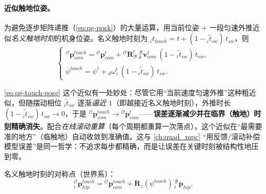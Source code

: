 \paragraph{近似触地位姿。}
为避免逐步矩阵递推（\cref{eq:qg-posk}）的大量运算，用当前位姿 + 一段匀速外推近似\emph{名义触地时刻}的机身位姿\cite{yu2021quadruped}。名义触地时刻为 ${}_it_{touch}=t+(1-{}_i\tilde t_{sw})\,t_{sw}$，则
\begin{equation}
  \begin{cases}
  {}^{\mathcal{O}}\boldsymbol{p}_{com}^{touch}={}^{\mathcal{O}}\boldsymbol{p}_{com}^{t}+{}^{\mathcal{O}}\mathbf{R}_{\mathcal{B}}^{t}\,{}_d^{\mathcal{B}}\boldsymbol{v}_{com}^{t}\,(1-{}_i\tilde t_{sw})\,t_{sw},\\
  \psi^{touch}=\psi^{t}+{}_d\omega_z^{t}\,(1-{}_i\tilde t_{sw})\,t_{sw}.
  \end{cases}
  \label{eq:qg-touch-pose}
\end{equation}

\begin{insight}\label{ins:qg-touch-vanish}
\cref{eq:qg-touch-pose} 这个近似有一处妙处：尽管它用“当前速度匀速外推”这种粗近似，但随摆动相位 ${}_i\tilde t_{sw}$ 逐渐\emph{逼近 $1$}（即越接近名义触地时刻），外推时长 $(1-{}_i\tilde t_{sw})\,t_{sw}\to0$，于是 ${}^{\mathcal{O}}\boldsymbol{p}_{com}^{touch}\to{}^{\mathcal{O}}\boldsymbol{p}_{com}^{t}$——\textbf{误差逐渐减少并在临界（触地）时刻精确消失}\cite{yu2021quadruped}。配合\emph{在线滚动重算}（每个周期都重算一次落点），这个近似在“最需要准的地方”（临触地）自动收敛到准确值。这与 \cref{ch:quad_mpc} “用反馈/滚动补偿模型误差”是同一哲学：不追求每步都精确，而是让误差在关键时刻被结构性地压到零。
\end{insight}

名义触地时刻的对称点（世界系）\cite{yu2021quadruped}：
\begin{equation}
  {}_i^{\mathcal{O}}\boldsymbol{p}_{hip}^{touch}={}^{\mathcal{O}}\boldsymbol{p}_{com}^{touch}+\mathbf{R}_z(\psi^{touch})\,{}_i^{\mathcal{B}}\boldsymbol{p}_{hip}.
  \label{eq:qg-hip-touch}
\end{equation}

